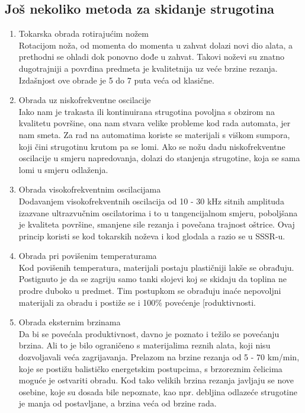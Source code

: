 \documentclass[a4paper,12pt]{article}
\numberwithin{figure}{section}
\begin{document}
\subsection{Još nekoliko metoda za skidanje strugotina}
\begin{enumerate}
\item Tokarska obrada rotirajućim nožem \\
Rotacijom noža, od momenta do momenta u zahvat dolazi novi dio alata, a prethodni se ohladi dok ponovno dođe u zahvat. Takovi noževi su znatno dugotrajniji a povrđina predmeta je kvalitetnija uz veće brzine rezanja. Izdašnjost ove obrade je 5 do 7 puta veća od klasične.
\item Obrada uz niskofrekventne oscilacije \\
Iako nam je trakasta ili kontinuirana strugotina povoljna s obzirom  na kvalitetu površine, ona nam stvara velike probleme kod rada automata, jer nam smeta. Za rad na automatima koriste se materijali s viškom sumpora, koji čini strugotinu krutom pa se lomi. Ako se nožu dadu niskofrekventne oscilacije u smjeru napredovanja, dolazi do stanjenja strugotine, koja se sama lomi u smjeru odlaženja.
\item Obrada visokofrekventnim oscilacijama\\
Dodavanjem visokofrekventnih oscilacija od 10 - 30 kHz sitnih amplituda izazvane ultrazvučnim oscilatorima i to u tangencijalnom smjeru, poboljšana je kvaliteta površine, smanjene sile rezanja i povečana trajnost oštrice. Ovaj princip koristi se kod tokarskih noževa i kod glodala a razio se u SSSR-u.
\item Obrada pri povišenim temperaturama\\
Kod povišenih temperatura, materijali postaju plastičniji lakše se obrađuju. Postignuto je da se zagriju samo tanki slojevi koj se skidaju da toplina ne prodre duboko u predmet. Tim postupkom se obrađuju inaće nepovoljni materijali za obradu i postiže se i 100$\%$ povećenje [roduktivnosti.
\item Obrada eksternim brzinama\\
Da bi se povećala produktivnost, davno je poznato i težilo se povećanju brzina. Ali to je bilo ograničeno s materijalima reznih alata, koji nisu dozvoljavali veća zagrijavanja. Prelazom na brzine rezanja od 5 - 70 km/min, koje se postižu balističko energetskim postupcima, s brzoreznim čelicima moguće je ostvariti obradu. Kod tako velikih brzina rezanja javljaju se nove osebine, koje su dosada bile nepoznate, kao npr. debljina odlazeće strugotine je manja od postavljane, a brzina veća od brzine rada.
\end{enumerate}
\end{document}
